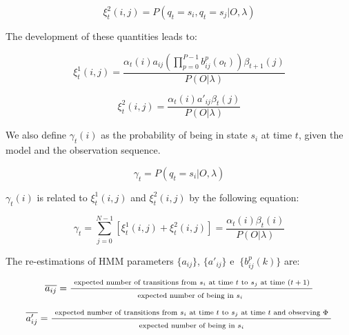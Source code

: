 \documentclass{article}[14pt, oneside, a4paper, times]
\begin{document}
\begin{equation}
    \xi_t^2(i,j) = P(q_t = s_i, q_t = s_j | O, \lambda)
    \label{EQ:xi-2}
\end{equation}

The development of these quantities leads to:

\begin{equation}
    \xi_t^1(i,j) = \frac{ \alpha_t(i) a_{ij} \left( \prod_{p=0}^{P-1} b_{ij}^p(o_t) \right) \beta_{t+1}(j)} { P(O | \lambda) }
    \label{EQ:xi-3}
\end{equation}

\begin{equation}
    \xi_t^2(i,j) = \frac{ \alpha_t(i) a'_{ij} \beta_t(j)} { P(O | \lambda) }
    \label{EQ:xi-4}
\end{equation}

We also define $\gamma_t(i)$ as the probability of being in state $s_i$ at time
$t$, given the model and the observation sequence.

\begin{equation}
    \gamma_t = P(q_t = s_i | O, \lambda)
    \label{EQ:gamma-1}
\end{equation}

$\gamma_t(i)$ is related to $\xi_t^1(i,j)$ and $\xi_t^2(i,j)$ by the following
equation:

\begin{equation}
    \gamma_t =
        \sum_{j=0}^{N-1} [ \xi_t^1(i,j) + \xi_t^2(i,j) ] = \frac{\alpha_t(i) \beta_t(i)} {P(O | \lambda)}
    \label{EQ:gamma-2}
\end{equation}

The re-estimations of HMM parameters $\{ a_{ij} \}$, $\{ a'_{ij} \}$ e $\
\{b_{ij}^p(k) \}$ are:

\begin{equation}
    \overline{a_{ij}} =
        \frac{ \mbox{ \scriptsize{expected number of transitions from
                        $s_i$ at time $t$ to $s_j$ at time $(t+1)$ }}}
             { \mbox{\scriptsize{expected number of being in $s_i$ }}}
    \label{EQ:a-1}
\end{equation}

\begin{equation}
    \overline{a'_{ij}} =
        \frac{ \mbox{ \scriptsize{expected number of transitions from
                    $s_i$ at time $t$ to $s_j$ at time $t$ and observing $\Phi$ }}}
             { \mbox{ \scriptsize{expected number of being in $s_i$ }}}
    \label{EQ:a2-1}
\end{equation}
\end{document}
